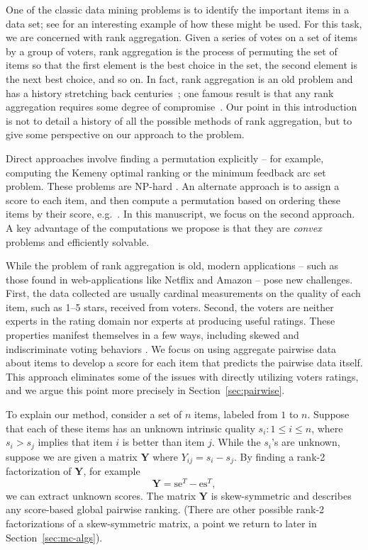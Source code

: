 \documentclass{sig-alternate}
\renewcommand{\cite}{\citep}
\newcommand{\mat}{\boldsymbol}
\renewcommand{\vec}[1]{\boldsymbol{\mathrm{#1}}}
\providecommand{\mY}{\ensuremath{\mat{Y}}}
\providecommand{\ve}{\ensuremath{\vec{e}}}
\providecommand{\vs}{\ensuremath{\vec{s}}}
\begin{document}
One of the classic data mining problems is to identify the
important items in a data set; see \citet{Tan-2004-ordering}
for an interesting example of how these might be used. For this task, 
we are concerned with rank aggregation.
Given a series of votes on a set of items by a group of voters,
rank aggregation is the process of permuting the set of items so that
the first element is the best choice in the set, the second
element is the next best choice, and so on.  
In fact, rank aggregation is an old problem and has a history stretching 
back centuries~\cite{condorcet1785-essai}; one famous 
result is that any rank aggregation requires some 
degree of compromise~\cite{arrow1950-impossibility}.  
Our point in this introduction
is not to detail a history of all the possible methods of
rank aggregation, but to give some perspective on our approach to
the problem.

Direct approaches involve finding a permutation
explicitly -- for example, computing the Kemeny optimal
ranking \cite{kemeny1959-math-without-numbers} or
the minimum feedback arc set problem.  
These problems are NP-hard 
\cite{dwork2001-rank-aggregation,ailon2005-ranking,alon2006-ranking}.
An alternate approach is to assign a score to 
each item, and then compute a permutation based on
ordering these items by their score, e.g.\ \citet{saaty1987-perron}.
In this manuscript, we focus on the second approach.  A
key advantage of the computations we propose
is that they are \emph{convex} problems and efficiently
solvable.

While
the problem of rank aggregation is old, modern applications --
such as those found in web-applications like Netflix and Amazon --
pose new challenges. 
First, the data collected are usually
cardinal measurements on the quality of each
item, such as  1--5 stars, received from voters.
Second, the voters are neither experts in the rating domain nor
experts at producing useful ratings.  These properties
manifest themselves in a few ways, including skewed
and indiscriminate voting behaviors \cite{ho2008-ratings}.
We focus on using aggregate pairwise 
data about items to develop a score for each item that
predicts the pairwise data itself.  This approach
eliminates some of the issues with directly utilizing
voters ratings, and we argue this point more precisely
in Section~\ref{sec:pairwise}.





To explain our method, consider a set of $n$ items, labeled from $1$ to $n$.  
Suppose that each of these
items has an unknown intrinsic quality $s_i : 1 \le i \le n$,
where $s_i > s_j$ implies that item $i$ is better
than item $j$.  While the $s_i$'s are unknown, 
suppose we are given
a matrix $\mY$ where $Y_{ij} = s_i - s_j$.  By 
finding a rank-2 factorization of $\mY$, for example
\begin{equation}
\mY = \vs \ve^T - \ve \vs^T,
\end{equation}
we can extract unknown scores.  The matrix $\mY$
is  skew-symmetric and describes any score-based global pairwise
ranking.  (There are other possible rank-2 factorizations
of a skew-symmetric matrix, 
a point we return to later in Section~\ref{sec:mc-algs}).
\end{document}
